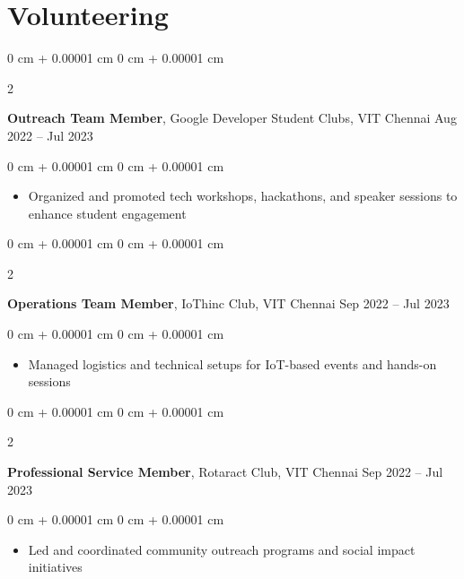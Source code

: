 \documentclass[10pt, letterpaper]{article}
\newenvironment{highlights}{
    \begin{itemize}[
        topsep=0.10 cm,
        parsep=0.10 cm,
        partopsep=0pt,
        itemsep=0pt,
        leftmargin=0 cm + 10pt
    ]
}{
    \end{itemize}
} %
\newenvironment{onecolentry}{
    \begin{adjustwidth}{
        0 cm + 0.00001 cm
    }{
        0 cm + 0.00001 cm
    }
}{
    \end{adjustwidth}
} %
\newenvironment{twocolentry}[2][]{
    \onecolentry
    \def\secondColumn{#2}
    \setcolumnwidth{\fill, 4.5 cm}
    \begin{paracol}{2}
}{
    \switchcolumn \raggedleft \secondColumn
    \end{paracol}
    \endonecolentry
} %
\begin{document}
    
    

        
    
  
        
 \section{Volunteering}

    \begin{twocolentry}{
            Aug 2022 – Jul 2023 
        }
            \textbf{Outreach Team Member}, Google Developer Student Clubs, VIT Chennai \end{twocolentry}

        \vspace{0.10 cm}
        \begin{onecolentry}
            \begin{highlights}
                \item Organized and promoted tech workshops, hackathons, and speaker sessions to enhance student engagement 
            \end{highlights}
        \end{onecolentry}

        \vspace{0.2 cm}
        
        \begin{twocolentry}{
            Sep 2022 – Jul 2023 
        }
            \textbf{Operations Team Member}, IoThinc Club, VIT Chennai \end{twocolentry}

        \vspace{0.10 cm}
        \begin{onecolentry}
            \begin{highlights}
                \item Managed logistics and technical setups for IoT-based events and hands-on sessions 
            \end{highlights}
        \end{onecolentry}
         \vspace{0.2 cm}
        
        \begin{twocolentry}{
            Sep 2022 – Jul 2023 
        }
            \textbf{Professional Service Member}, Rotaract Club, VIT Chennai \end{twocolentry}

        \vspace{0.10 cm}
        \begin{onecolentry}
            \begin{highlights}
                \item Led and coordinated community outreach programs and social impact initiatives 
            \end{highlights}
        \end{onecolentry}
         \vspace{0.2 cm}
        
\end{document}
